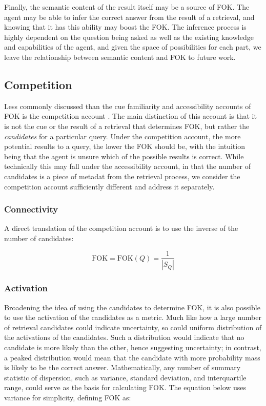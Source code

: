 \documentclass[10pt,letterpaper]{article}
\newcommand{\fok}[0]{\text{FOK}}
\begin{document}
Finally, the semantic content of the result itself may be a source of FOK.
The agent may be able to infer the correct answer from the result of a retrieval, and knowing that it has this ability may boost the FOK.
The inference process is highly dependent on the question being asked as well as the existing knowledge and capabilities of the agent, and given the space of possibilities for each part, we leave the relationship between semantic content and FOK to future work.

\subsection{Competition}

Less commonly discussed than the cue familiarity and accessibility accounts of FOK is the competition account \cite{Schreiber1998TheRelationBetween}.
The main distinction of this account is that it is not the cue or the result of a retrieval that determines FOK, but rather the \emph{candidates} for a particular query.
Under the competition account, the more potential results to a query, the lower the FOK should be, with the intuition being that the agent is unsure which of the possible results is correct.
While technically this may fall under the accessibility account, in that the number of candidates is a piece of metadat from the retrieval process, we consider the competition account sufficiently different and address it separately.

\subsubsection{Connectivity}

A direct translation of the competition account is to use the inverse of the number of candidates:

$$\fok = \fok(Q) = \frac{1}{|S_Q|}$$

\subsubsection{Activation}

Broadening the idea of using the candidates to determine FOK, it is also possible to use the activation of the candidates as a metric.
Much like how a large number of retrieval candidates could indicate uncertainty, so could uniform distribution of the activations of the candidates.
Such a distribution would indicate that no candidate is more likely than the other, hence suggesting uncertainty; in contrast, a peaked distribution would mean that the candidate with more probability mass is likely to be the correct answer.
Mathematically, any number of summary statistic of dispersion, such as variance, standard deviation, and interquartile range, could serve as the basis for calculating FOK.
The equation below uses variance for simplicity, defining FOK as:
\end{document}
